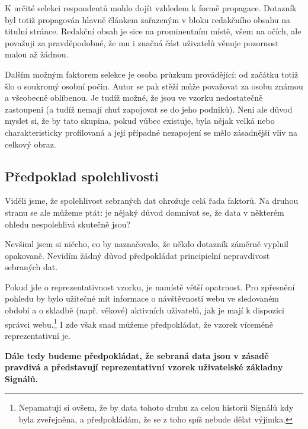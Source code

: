 K určité selekci respondentů mohlo dojít vzhledem k formě propagace.
Dotazník byl totiž propagován hlavně článkem zařazeným v bloku
redakčního obsahu na titulní stránce. Redakční obsah je sice
na prominentním místě, všem na očích, ale považuji za pravděpodobné,
že mu i značná část uživatelů věnuje pozornost malou až žádnou.

Dalším možným faktorem selekce je osoba průzkum provádějící:
od začátku totiž šlo o soukromý osobní počin. Autor se pak stěží
může považovat za osobu známou a všeobecně oblíbenou.
Je tudíž možné, že jsou ve vzorku nedostatečně zastoupeni
 (a tudíž nemají chuť
zapojovat se do jeho podniků).
Není ale důvod myslet si, že by tato skupina, pokud vůbec existuje,
byla nějak velká nebo charakteristicky profilovaná a její případné
nezapojení se mělo zásadnější vliv na celkový obraz.

\subsection{Předpoklad spolehlivosti}

Viděli jsme, že spolehlivost sebraných dat ohrožuje celá řada
faktorů. Na druhou stranu se ale můžeme ptát:
je nějaký důvod domnívat se, že data v některém ohledu nespolehlivá
skutečně jsou?

Nevšiml jsem si ničeho, co by naznačovalo, že někdo dotazník
záměrně vyplnil opakovaně. Nevidím žádný důvod předpokládat
principielní nepravdivost sebraných dat.

Pokud jde o reprezentativnost vzorku, je namístě větší opatrnost.
Pro zpřesnění pohledu by bylo užitečné mít informace
o návštěvnosti webu ve sledovaném období a o skladbě (např. věkové)
aktivních uživatelů, jak je mají k dispozici
správci webu.\footnote{
  Nepamatuji si ovšem, že by data tohoto druhu za celou historii
  Signálů kdy byla zveřejněna, a předpokládám, že se z toho
  spíš nebude dělat výjimka.
}
I zde však snad můžeme předpokládat, že vzorek víceméně
reprezentativní je.

\textbf{Dále tedy budeme předpokládat, že sebraná data jsou v zásadě
pravdivá a představují reprezentativní vzorek uživatelské základny
Signálů.}
